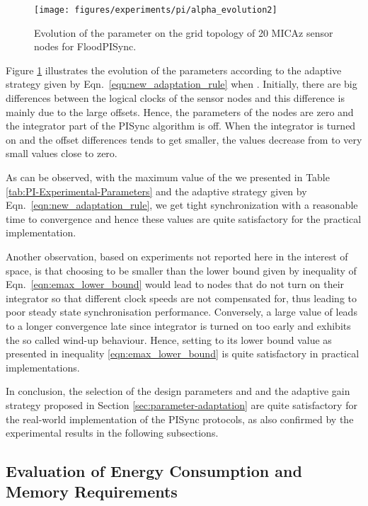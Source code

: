 \documentclass[english,a4paper,10pt,final]{article}
\numberwithin{equation}{section}
\numberwithin{figure}{section}
\begin{document}
\begin{figure}
\center

\texttt{[image: figures/experiments/pi/alpha\_evolution2]}

\caption{\label{fig:alpha-evolution} Evolution of the  parameter on the  grid topology of 20 MICAz sensor nodes for FloodPISync.}
\end{figure}

Figure \ref{fig:alpha-evolution} illustrates the evolution of the  parameters  according to the adaptive strategy given by Eqn.~\eqref{eqn:new_adaptation_rule} when  . Initially, there are big differences between the logical clocks of the sensor nodes and this difference is  mainly due to the large offsets.  Hence, the  parameters of the nodes are zero and the integrator part of the PISync algorithm is off. When the integrator is turned on
and the offset differences tends to get smaller, the  values decrease from  to very small values close to zero.

As can be observed, with the maximum value of the  we presented in Table \ref{tab:PI-Experimental-Parameters} and the adaptive strategy given by Eqn.~\eqref{eqn:new_adaptation_rule}, we get tight synchronization with a reasonable time to convergence and hence these values are quite satisfactory for the practical implementation. 


Another observation, based on experiments not reported here in the interest of space, is that choosing  to be smaller than the lower bound given by inequality of Eqn.~\eqref{eqn:emax_lower_bound} would lead to nodes that do not turn on their integrator so that different clock speeds are not compensated for, thus leading to poor steady state synchronisation performance. Conversely, a large value of  leads to a longer convergence late since integrator is turned on too early and exhibits the so called wind-up behaviour. Hence, setting  to its lower bound value as presented in inequality \ref{eqn:emax_lower_bound} is quite satisfactory in practical implementations.

In conclusion, the selection of the design parameters  and  and the adaptive gain strategy proposed in Section \ref{sec:parameter-adaptation} are quite satisfactory for the real-world implementation of the PISync protocols, as also confirmed by the experimental results in the following subsections.

\subsection{Evaluation of Energy Consumption and Memory Requirements}
\end{document}
